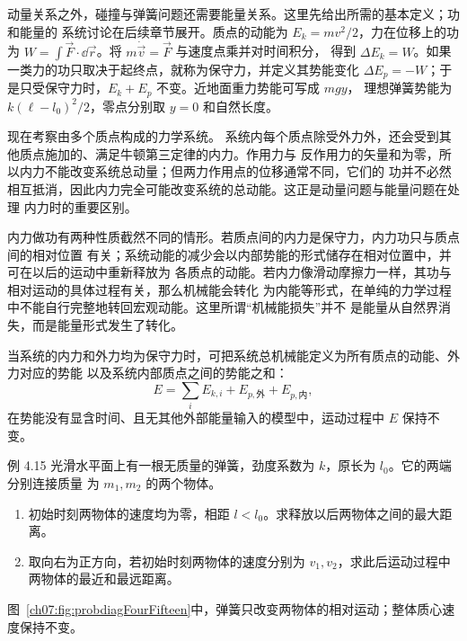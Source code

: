 动量关系之外，碰撞与弹簧问题还需要能量关系。这里先给出所需的基本定义；功和能量的
系统讨论在后续章节展开。质点的动能为 $E_k=mv^2/2$，力在位移上的功为
$W=\int\vec F\cdot\dd\vec r$。将 $m\dot{\vec v}=\vec F$ 与速度点乘并对时间积分，
得到 $\Delta E_k=W$。如果一类力的功只取决于起终点，就称为保守力，并定义其势能变化
$\Delta E_p=-W$；于是只受保守力时，$E_k+E_p$ 不变。近地面重力势能可写成 $mgy$，
理想弹簧势能为 $k(\ell-l_0)^2/2$，零点分别取 $y=0$ 和自然长度。

现在考察由多个质点构成的力学系统。
系统内每个质点除受外力外，还会受到其他质点施加的、满足牛顿第三定律的内力。作用力与
反作用力的矢量和为零，所以内力不能改变系统总动量；但两力作用点的位移通常不同，它们的
功并不必然相互抵消，因此内力完全可能改变系统的总动能。这正是动量问题与能量问题在处理
内力时的重要区别。

内力做功有两种性质截然不同的情形。若质点间的内力是保守力，内力功只与质点间的相对位置
有关；系统动能的减少会以内部势能的形式储存在相对位置中，并可在以后的运动中重新释放为
各质点的动能。若内力像滑动摩擦力一样，其功与相对运动的具体过程有关，那么机械能会转化
为内能等形式，在单纯的力学过程中不能自行完整地转回宏观动能。这里所谓“机械能损失”并不
是能量从自然界消失，而是能量形式发生了转化。

当系统的内力和外力均为保守力时，可把系统总机械能定义为所有质点的动能、外力对应的势能
以及系统内部质点之间的势能之和：
\[
 E=\sum_i E_{k,i}+E_{p,\text{外}}+E_{p,\text{内}},
\]
在势能没有显含时间、且无其他外部能量输入的模型中，运动过程中 $E$ 保持不变。

\begin{origexamplebox}{例 4.15}
光滑水平面上有一根无质量的弹簧，劲度系数为 $k$，原长为 $l_0$。它的两端分别连接质量
为 $m_1,m_2$ 的两个物体。
\begin{enumerate}[label=\arabic*.,leftmargin=2.2em]
 \item 初始时刻两物体的速度均为零，相距 $l<l_0$。求释放以后两物体之间的最大距离。
 \item 取向右为正方向，若初始时刻两物体的速度分别为 $v_1,v_2$，求此后运动过程中
 两物体的最近和最远距离。
\end{enumerate}
图~\ref{ch07:fig:probdiagFourFifteen}中，弹簧只改变两物体的相对运动；整体质心速度保持不变。
\probdiagFourFifteen
\end{origexamplebox}

